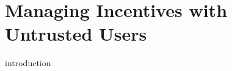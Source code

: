 \documentclass{Dissertate}
\begin{document}

\frontmatter
{}













\chapter{Managing Incentives with Untrusted Users}
\label{chap__trusted_auction}

{introduction}




\cleardoublepage





{}

\printbibliography



%
%


\end{document}
